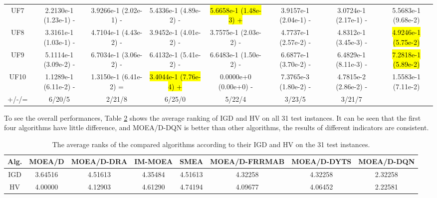 \documentclass[journal]{IEEEtran}
\begin{document}
\begin{table}[tbp]
{\begin{tabular}{cccccccc}
            UF7     & 2.2130e-1 (1.23e-1) -      & 3.9266e-1 (2.02e-1) -      & 5.4336e-1 (4.89e-2) -      & \hl{5.6658e-1 (1.48e-3) +} & 3.9157e-1 (2.04e-1) -      & 3.0724e-1 (2.17e-1) -      & 5.5683e-1 (9.68e-2)      \\
            UF8     & 3.3161e-1 (1.03e-1) -      & 4.7104e-1 (4.43e-2) -      & 3.9452e-1 (4.01e-2) -      & 3.7575e-1 (2.03e-2) -      & 4.7737e-1 (2.57e-2) -      & 4.8312e-1 (3.45e-3) -      & \hl{4.9246e-1 (5.75e-2)} \\
            UF9     & 5.1114e-1 (3.09e-2) -      & 6.7034e-1 (3.06e-2) -      & 6.4132e-1 (5.41e-2) -      & 6.6483e-1 (1.50e-2) -      & 6.6877e-1 (3.70e-2) -      & 6.4829e-1 (8.11e-3) -      & \hl{7.2818e-1 (5.89e-2)} \\
            UF10    & 1.1289e-1 (6.11e-2) -      & 1.3150e-1 (6.41e-2) =      & \hl{3.4044e-1 (7.76e-4) +} & 0.0000e+0 (0.00e+0) -      & 7.3765e-3 (1.80e-2) -      & 4.7815e-2 (2.86e-2) -      & 1.5583e-1 (7.11e-2)      \\
            \hline
            +/-/=   & 6/20/5                     & 2/21/8                     & 6/25/0                     & 5/22/4                     & 3/23/5                     & 3/21/7                     &                          \\
            \bottomrule
        \end{tabular}
    }
    \label{tab:hv_all}
\end{table}

To see the overall performances, Table \ref{tab:rank_all} shows the average ranking of IGD and HV on all 31 test instances.
It can be seen that the first four algorithms have little difference, and MOEA/D-DQN is better than other algorithms, the results of different indicators are consistent.


\begin{table}[tbp]
    \renewcommand{\arraystretch}{1.2}  %
    \centering
    \caption{The average ranks of the compared algorithms according to their IGD and HV on the 31 test instances.}
    \begin{tabular}{cccccccc}
        \toprule
        Alg. & MOEA/D  & MOEA/D-DRA & IM-MOEA & SMEA    & MOEA/D-FRRMAB & MOEA/D-DYTS & MOEA/D-DQN \\
        \midrule
        IGD  & 3.64516 & 4.51613    & 4.35484 & 4.51613 & 4.32258       & 4.32258     & 2.32258    \\
        HV   & 4.00000 & 4.12903    & 4.61290 & 4.74194 & 4.09677       & 4.06452     & 2.22581    \\
        \bottomrule
    \end{tabular}
    \label{tab:rank_all}
\end{table}
\end{document}
